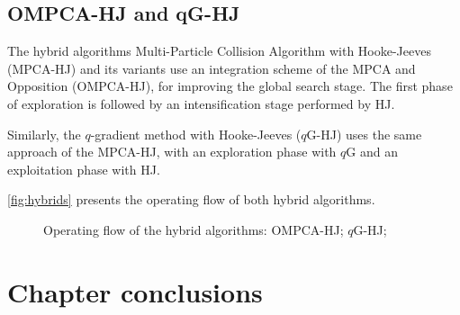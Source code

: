 







\subsection{OMPCA-HJ and qG-HJ}

The hybrid algorithms Multi-Particle Collision Algorithm with Hooke-Jeeves (MPCA-HJ) and its variants use an integration scheme of the MPCA and Opposition (OMPCA-HJ), for improving the global search stage. The first phase of exploration is followed by an intensification stage performed by HJ.

Similarly, the $q$-gradient method with Hooke-Jeeves ($q$G-HJ) uses the same approach of the MPCA-HJ, with an exploration phase with $q$G and an exploitation phase with HJ.

\autoref{fig:hybrids} presents the operating flow of both hybrid algorithms.

\begin{figure}[H]%
\caption[Operating flow of the hybrid algorithms]{Operating flow of the hybrid algorithms:  OMPCA-HJ;  $q$G-HJ;}%
\label{fig:hybrids}%
\vspace{1em}
\centering
{}
\hspace{8pt}%
%
\end{figure}

\section{Chapter conclusions}

